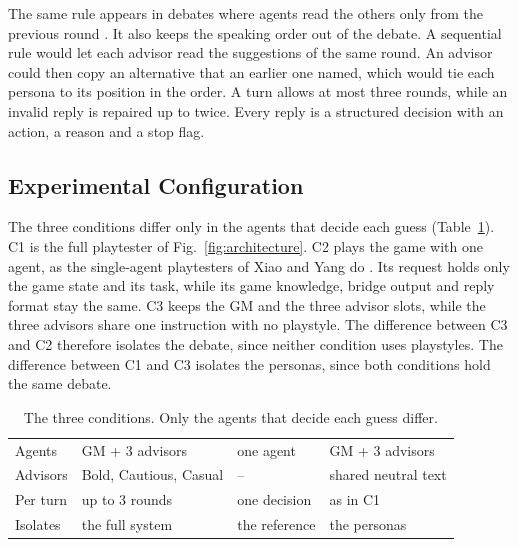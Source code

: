 \documentclass[conference]{IEEEtran}
\begin{document}
The same rule appears in debates where agents read the others only from the previous round \cite{du2024}. It also keeps the speaking order out of the debate. A sequential rule would let each advisor read the suggestions of the same round. An advisor could then copy an alternative that an earlier one named, which would tie each persona to its position in the order. A turn allows at most three rounds, while an invalid reply is repaired up to twice. Every reply is a structured decision with an action, a reason and a stop flag.

\subsection{Experimental Configuration}
The three conditions differ only in the agents that decide each guess (Table~\ref{tab:conditions}). C1 is the full playtester of Fig.~\ref{fig:architecture}. C2 plays the game with one agent, as the single-agent playtesters of Xiao and Yang do \cite{xiao2025}. Its request holds only the game state and its task, while its game knowledge, bridge output and reply format stay the same. C3 keeps the GM and the three advisor slots, while the three advisors share one instruction with no playstyle. The difference between C3 and C2 therefore isolates the debate, since neither condition uses playstyles. The difference between C1 and C3 isolates the personas, since both conditions hold the same debate.

\begin{table}[t]
\caption{The three conditions. Only the agents that decide each guess differ.}
\label{tab:conditions}
\centering
\footnotesize
\begin{tabular}{@{}>{\raggedright\arraybackslash}p{0.50in}
>{\raggedright\arraybackslash}p{0.82in}
>{\raggedright\arraybackslash}p{0.68in}
>{\raggedright\arraybackslash}p{0.82in}@{}}
\hline
 & \multicolumn{1}{c}{C1} & \multicolumn{1}{c}{C2} & \multicolumn{1}{c}{C3} \\
\hline
Agents & GM + 3 advisors & one agent & GM + 3 advisors \\
Advisors & Bold, Cautious, Casual & -- & shared neutral text \\
Per turn & up to 3 rounds & one decision & as in C1 \\
Isolates & the full system & the reference & the personas \\
\hline
\end{tabular}
\end{table}
\end{document}
